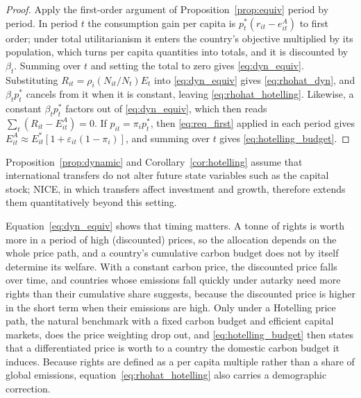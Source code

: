 \documentclass[12pt,english]{article}
\theoremstyle{remark}
\begin{document}
\begin{proof}
Apply the first-order argument of Proposition~\ref{prop:equiv} period by period. In period $t$ the consumption gain per capita is $p^*_t(r_{it}-e^A_{it})$ to first order; under total utilitarianism it enters the country's objective multiplied by its population, which turns per capita quantities into totals, %
and it is discounted by $\beta_t$. Summing over $t$ and setting the total to zero gives \eqref{eq:dyn_equiv}. Substituting $R_{it}=\rho_i(N_{it}/N_t)E_t$ into \eqref{eq:dyn_equiv} gives \eqref{eq:rhohat_dyn}, and $\beta_t p^*_t$ cancels from it when it is constant, leaving \eqref{eq:rhohat_hotelling}. Likewise, a constant $\beta_t p^*_t$ factors out of \eqref{eq:dyn_equiv}, which then reads $\sum_t (R_{it}-E^A_{it})=0$. If $p_{it}=\pi_i p^*_t$, then \eqref{eq:req_first} applied in each period gives $E^A_{it}\approx E^*_{it}[1+\varepsilon_{it}(1-\pi_i)]$, and summing over $t$ gives \eqref{eq:hotelling_budget}.
\end{proof}

Proposition~\ref{prop:dynamic} and Corollary~\ref{cor:hotelling} assume that international transfers do not alter future state variables such as the capital stock; NICE, in which transfers affect investment and growth, therefore extends them quantitatively beyond this setting.

Equation~\eqref{eq:dyn_equiv} shows that timing matters. A tonne of rights is worth more in a period of high (discounted) prices, so the allocation depends on the whole price path, and a country's cumulative carbon budget does not by itself determine its welfare. 
With a constant carbon price, the discounted price falls over time, and countries whose emissions fall quickly under autarky need more rights than their cumulative share suggests, because the discounted price is higher in the short term when their emissions are high. 
Only under a Hotelling price path, the natural benchmark with a fixed carbon budget and efficient capital markets, does the price weighting drop out, and \eqref{eq:hotelling_budget} then states that a differentiated price is worth to a country the domestic carbon budget it induces. Because rights are defined as a per capita multiple rather than a share of global emissions, equation~\eqref{eq:rhohat_hotelling} also carries a demographic correction. %
\end{document}
